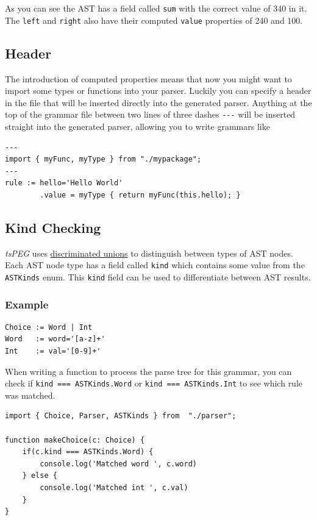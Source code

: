 As you can see the AST has a field called \texttt{sum} with the correct
value of 340 in it. The \texttt{left} and \texttt{right} also have their
computed \texttt{value} properties of 240 and 100.

\subsection{Header}\label{header}

The introduction of computed properties means that now you might want to
import some types or functions into your parser. Luckily you can specify
a header in the file that will be inserted directly into the generated
parser. Anything at the top of the grammar file between two lines of
three dashes \texttt{-\/-\/-} will be inserted straight into the
generated parser, allowing you to write grammars like

\begin{verbatim}
---
import { myFunc, myType } from "./mypackage";
---
rule := hello='Hello World'
        .value = myType { return myFunc(this.hello); }
\end{verbatim}

\subsection{Kind Checking}\label{kind-checking}

\emph{tsPEG} uses
\href{https://www.typescriptlang.org/docs/handbook/advanced-types.html\#discriminated-unions}{discriminated
unions} to distinguish between types of AST nodes. Each AST node type
has a field called \texttt{kind} which contains some value from the
\texttt{ASTKinds} enum. This \texttt{kind} field can be used to
differentiate between AST results.

\subsubsection{Example}\label{example}

\begin{verbatim}
Choice := Word | Int
Word   := word='[a-z]+'
Int    := val='[0-9]+'
\end{verbatim}

When writing a function to process the parse tree for this grammar, you
can check if \texttt{kind\ ===\ ASTKinds.Word} or
\texttt{kind\ ===\ ASTKinds.Int} to see which rule was matched.

\begin{verbatim}
import { Choice, Parser, ASTKinds } from  "./parser";

function makeChoice(c: Choice) {
    if(c.kind === ASTKinds.Word) {
        console.log('Matched word ', c.word)
    } else {
        console.log('Matched int ', c.val)
    }
}
\end{verbatim}

